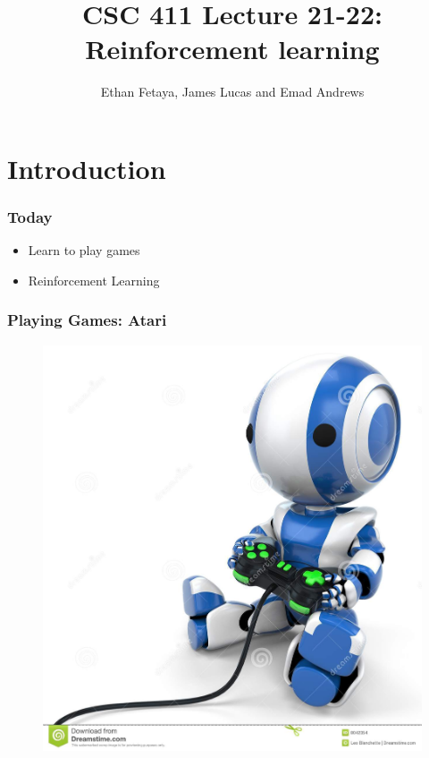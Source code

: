 \documentclass[handout]{beamer}
\begin{document}
	\title[CSC411 Lec19]{CSC 411 Lecture 21-22: Reinforcement learning}  
	\author[]{Ethan Fetaya, James Lucas and Emad Andrews}
	\date{}
	
	\begin{frame}
	\titlepage
\end{frame}



\section{Introduction}



\begin{frame}\frametitle{Today}\small
\begin{itemize}
\item Learn to play games
\item Reinforcement Learning
\end{itemize}
\vspace{2mm}

% 
\end{frame}

\begin{frame}\frametitle{Playing Games: Atari}\small
\begin{figure}
\href{run:videos/intro/deep_mind.mp4}{
\includegraphics[width =0.6\linewidth,trim=0 69 0 0,clip]{Figures/robot_game.jpg}\\
{}
}
\end{figure}
\end{frame}
\end{document}
